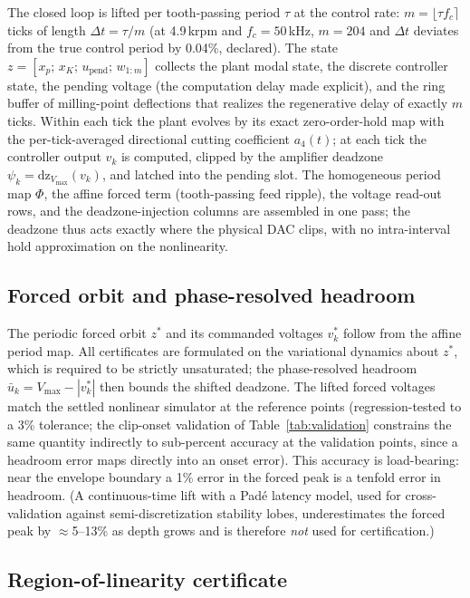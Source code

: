 \documentclass[preprint,12pt]{elsarticle}
\newcommand{\dz}{\mathrm{dz}}
\begin{document}
The closed loop is lifted per tooth-passing period $\tau$ at the
control rate: $m=\lfloor \tau f_c\rceil$ ticks of length
$\Delta t=\tau/m$ (at 4.9\,krpm and $f_c=50$\,kHz, $m=204$ and
$\Delta t$ deviates from the true control period by 0.04\%,
declared). The state
$z=[x_p;\,x_K;\,u_{\mathrm{pend}};\,w_{1:m}]$ collects the plant
modal state, the discrete controller state, the pending voltage (the
computation delay made explicit), and the ring buffer of milling-point
deflections that realizes the regenerative delay of exactly $m$
ticks. Within each tick the plant evolves by its exact zero-order-hold
map with the per-tick-averaged directional cutting coefficient
$a_4(t)$; at each tick the controller output
$v_k$ is computed, clipped by the amplifier deadzone
$\psi_k=\dz_{V_{\max}}(v_k)$, and latched into the pending slot. The
homogeneous period map $\Phi$, the affine forced term (tooth-passing
feed ripple), the voltage read-out rows, and the deadzone-injection
columns are assembled in one pass; the deadzone thus acts exactly
where the physical DAC clips, with no intra-interval hold
approximation on the nonlinearity.

\subsection{Forced orbit and phase-resolved headroom}

The periodic forced orbit $z^*$ and its commanded voltages $v^*_k$
follow from the affine period map. All certificates are formulated on
the variational dynamics about $z^*$, which is required to be
strictly unsaturated; the phase-resolved headroom
$\bar u_k = V_{\max}-|v^*_k|$ then bounds the shifted deadzone. The
lifted forced voltages match the settled nonlinear simulator at
the reference points (regression-tested to a 3\% tolerance; the
clip-onset validation of Table~\ref{tab:validation} constrains the
same quantity indirectly to sub-percent accuracy at the validation
points, since a headroom error maps directly into an onset error).
This accuracy is load-bearing: near the envelope boundary a 1\% error
in the forced peak is a tenfold error in headroom. (A continuous-time
lift with a Pad\'e latency model, used for cross-validation against
semi-discretization stability lobes, underestimates the forced peak
by $\approx$5--13\% as depth grows and is therefore \emph{not} used
for certification.)

\subsection{Region-of-linearity certificate}
\end{document}
